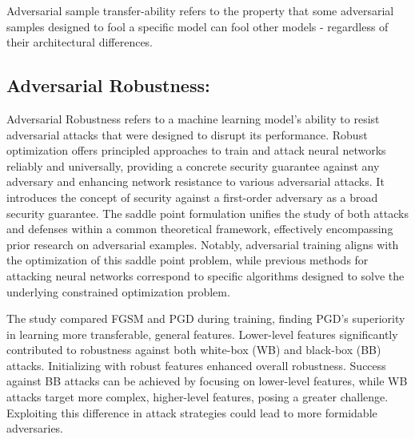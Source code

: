 \documentclass{article}
\begin{document}
\setlength{\parskip}{10pt}
\begingroup
\raggedright
Adversarial sample transfer-ability refers to the property that some adversarial samples designed to fool a specific model can fool other models - regardless of their architectural differences. \cite{goodfellow2015explaining}
\endgroup

\subsection{Adversarial Robustness:} 
Adversarial Robustness refers to a machine learning model’s ability to resist adversarial attacks that were designed to disrupt its performance. 
Robust optimization offers principled approaches to train and attack neural networks reliably and universally, providing a concrete security guarantee against any adversary and enhancing network resistance to various adversarial attacks. It introduces the concept of security against a first-order adversary as a broad security guarantee. The saddle point formulation unifies the study of both attacks and defenses within a common theoretical framework, effectively encompassing prior research on adversarial examples. Notably, adversarial training aligns with the optimization of this saddle point problem, while previous methods for attacking neural networks correspond to specific algorithms designed to solve the underlying constrained optimization problem. \cite{madry2017towards}

\setlength{\parskip}{10pt}
\begingroup
\raggedright
The study compared FGSM and PGD during training, finding PGD's superiority in learning more transferable, general features. Lower-level features significantly contributed to robustness against both white-box (WB) and black-box (BB) attacks. Initializing with robust features enhanced overall robustness. Success against BB attacks can be achieved by focusing on lower-level features, while WB attacks target more complex, higher-level features, posing a greater challenge. Exploiting this difference in attack strategies could lead to more formidable adversaries. \cite{davchev2019empirical}
\endgroup





\end{document}
